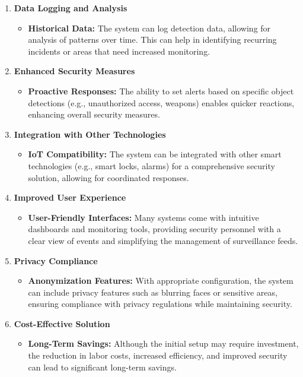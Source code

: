 \documentclass[openany,12pt]{report}
\begin{document}
\begin{enumerate}
    \item \textbf{Data Logging and Analysis}
    \begin{itemize}
        \item \textbf{Historical Data:} The system can log detection data, allowing for analysis of patterns over time. This can help in identifying recurring incidents or areas that need increased monitoring.
    \end{itemize}

    \item \textbf{Enhanced Security Measures}
    \begin{itemize}
        \item \textbf{Proactive Responses:} The ability to set alerts based on specific object detections (e.g., unauthorized access, weapons) enables quicker reactions, enhancing overall security measures.
    \end{itemize}

    \item \textbf{Integration with Other Technologies}
    \begin{itemize}
        \item \textbf{IoT Compatibility:} The system can be integrated with other smart technologies (e.g., smart locks, alarms) for a comprehensive security solution, allowing for coordinated responses.
    \end{itemize}

    \item \textbf{Improved User Experience}
    \begin{itemize}
        \item \textbf{User-Friendly Interfaces:} Many systems come with intuitive dashboards and monitoring tools, providing security personnel with a clear view of events and simplifying the management of surveillance feeds.
    \end{itemize}

    \item \textbf{Privacy Compliance}
    \begin{itemize}
        \item \textbf{Anonymization Features:} With appropriate configuration, the system can include privacy features such as blurring faces or sensitive areas, ensuring compliance with privacy regulations while maintaining security.
    \end{itemize}
    \newpage
    \item \textbf{Cost-Effective Solution}
    \begin{itemize}
        \item \textbf{Long-Term Savings:} Although the initial setup may require investment, the reduction in labor costs, increased efficiency, and improved security can lead to significant long-term savings.
    \end{itemize}


\end{enumerate}
\end{document}
